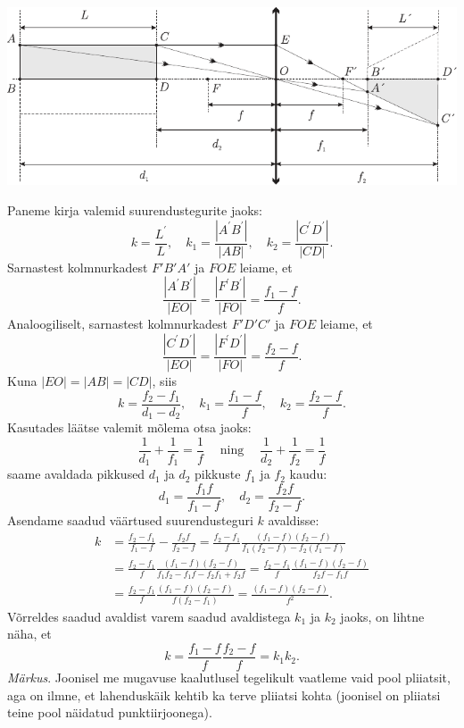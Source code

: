 \documentclass[10pt, twoside]{article}
\begin{document}
{\begin{center}
	\includegraphics[width=\linewidth]{2007-lahg-09-lah}
\end{center}

Paneme kirja valemid suurendustegurite jaoks:
\[
k=\frac{L^{\prime}}{L}, \quad k_{1}=\frac{|A^{\prime}B^{\prime}|}{|AB|}, \quad k_{2}=\frac{|C^{\prime}D^{\prime}|}{|CD|}.
\]
Sarnastest kolmnurkadest $F'B'A'$ ja $FOE$ leiame, et
\[
\frac{|A^{\prime}B^{\prime}|}{|EO|}=\frac{|F^{\prime}B^{\prime}|}{|FO|}=\frac{f_{1}-f}{f}.
\]
Analoogiliselt, sarnastest kolmnurkadest $F'D'C'$ ja $FOE$ leiame, et
\[
\frac{|C^{\prime}D^{\prime}|}{|EO|}=\frac{|F^{\prime}D^{\prime}|}{|FO|}=\frac{f_{2}-f}{f}.
\]
Kuna $|EO| = |AB| = |CD|$, siis
\[
k=\frac{f_{2}-f_{1}}{d_{1}-d_{2}}, \quad k_{1}=\frac{f_{1}-f}{f}, \quad k_{2}=\frac{f_{2}-f}{f}.
\]
Kasutades läätse valemit mõlema otsa jaoks:
\[
\frac{1}{d_{1}}+\frac{1}{f_{1}}=\frac{1}{f} \quad \operatorname{ning} \quad \frac{1}{d_{2}}+\frac{1}{f_{2}}=\frac{1}{f}
\]
saame avaldada pikkused $d_1$ ja $d_2$ pikkuste $f_1$ ja $f_2$ kaudu:
\[
d_{1}=\frac{f_{1} f}{f_{1}-f}, \quad d_{2}=\frac{f_{2} f}{f_{2}-f}.
\]
Asendame saadud väärtused suurendusteguri $k$ avaldisse:
\[
\begin{aligned}
	k&=\frac{f_{2}-f_{1}}{f_{1}-f}-\frac{f_{2} f}{f_{2}-f}=\frac{f_{2}-f_{1}}{f} \frac{\left(f_{1}-f\right)\left(f_{2}-f\right)}{f_{1}\left(f_{2}-f\right)-f_{2}\left(f_{1}-f\right)} \\ 
	&=\frac{f_{2}-f_{1}}{f} \frac{\left(f_{1}-f\right)\left(f_{2}-f\right)}{f_{1} f_{2}-f_{1} f-f_{2} f_{1}+f_{2} f}=\frac{f_{2}-f_{1}}{f} \frac{\left(f_{1}-f\right)\left(f_{2}-f\right)}{f_{2} f-f_{1} f} \\ &=\frac{f_{2}-f_{1}}{f} \frac{\left(f_{1}-f\right)\left(f_{2}-f\right)}{f\left(f_{2}-f_{1}\right)}=\frac{\left(f_{1}-f\right)\left(f_{2}-f\right)}{f^{2}}.
\end{aligned}
\]
Võrreldes saadud avaldist varem saadud avaldistega $k_1$ ja $k_2$ jaoks, on lihtne näha, et
\[
k=\frac{f_{1}-f}{f} \frac{f_{2}-f}{f}=k_{1} k_{2}.
\]
\emph{Märkus}. Joonisel me mugavuse kaalutlusel tegelikult vaatleme vaid pool pliiatsit, aga on ilmne, et lahenduskäik kehtib ka terve pliiatsi kohta (joonisel on pliiatsi teine pool näidatud punktiirjoonega).
\probend
\bigskip

}
\end{document}

